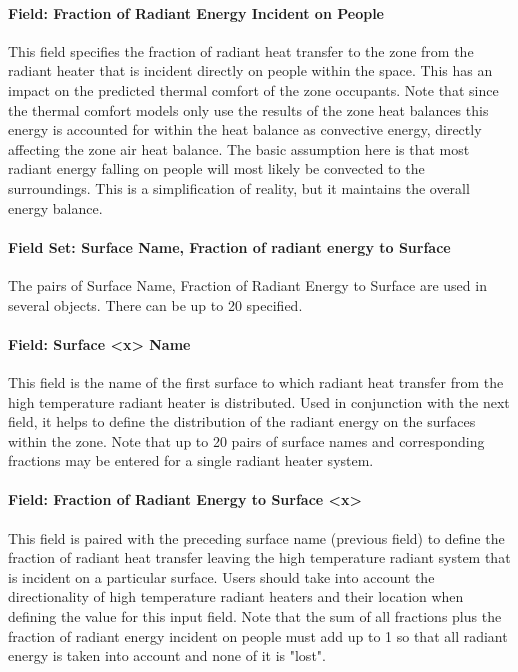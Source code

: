 \paragraph{Field: Fraction of Radiant Energy Incident on People}\label{field-fraction-of-radiant-energy-incident-on-people-3}

This field specifies the fraction of radiant heat transfer to the zone from the radiant heater that is incident directly on people within the space. This has an impact on the predicted thermal comfort of the zone occupants. Note that since the thermal comfort models only use the results of the zone heat balances this energy is accounted for within the heat balance as convective energy, directly affecting the zone air heat balance. The basic assumption here is that most radiant energy falling on people will most likely be convected to the surroundings. This is a simplification of reality, but it maintains the overall energy balance.

\paragraph{Field Set: Surface Name, Fraction of radiant energy to Surface}\label{field-set-surface-name-fraction-of-radiant-energy-to-surface-3}

The pairs of Surface Name, Fraction of Radiant Energy to Surface are used in several objects. There can be up to 20 specified.

\paragraph{Field: Surface \textless{}x\textgreater{} Name}\label{field-surface-x-name-3}

This field is the name of the first surface to which radiant heat transfer from the high temperature radiant heater is distributed. Used in conjunction with the next field, it helps to define the distribution of the radiant energy on the surfaces within the zone. Note that up to 20 pairs of surface names and corresponding fractions may be entered for a single radiant heater system.

\paragraph{Field: Fraction of Radiant Energy to Surface \textless{}x\textgreater{}}\label{field-fraction-of-radiant-energy-to-surface-x-2}

This field is paired with the preceding surface name (previous field) to define the fraction of radiant heat transfer leaving the high temperature radiant system that is incident on a particular surface. Users should take into account the directionality of high temperature radiant heaters and their location when defining the value for this input field. Note that the sum of all fractions plus the fraction of radiant energy incident on people must add up to 1 so that all radiant energy is taken into account and none of it is "lost".

